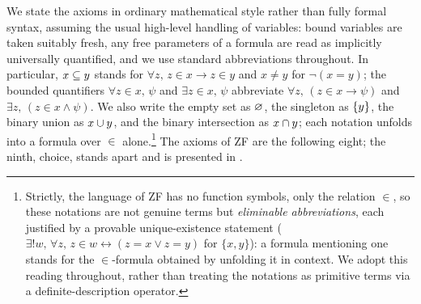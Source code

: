 We state the axioms in ordinary mathematical style rather than fully formal
syntax, assuming the usual high-level handling of variables: bound variables are
taken suitably fresh, any free parameters of a formula are read as implicitly
universally quantified, and we use standard abbreviations throughout.
In particular, $x \subseteq y$ stands for $\forall z,\, z \in x \to z \in y$
and $x \neq y$ for $\lnot(x = y)$; the bounded quantifiers $\forall z \in x,\,\psi$
and $\exists z \in x,\,\psi$ abbreviate $\forall z,\,(z \in x \to \psi)$ and
$\exists z,\,(z \in x \land \psi)$. We also write the empty set as
$\varnothing$, the singleton as $\{y\}$, the binary
union as $x \cup y$, and the binary intersection as
$x \cap y$; each notation unfolds into a formula over $\in$
alone.\footnote{%
  Strictly, the language of ZF has no function symbols, only the relation
  $\in$, so these notations are not genuine terms but \emph{eliminable
  abbreviations}, each justified by a provable unique-existence statement
  (\eg $\exists! w,\,\forall z,\,z \in w \leftrightarrow (z = x \lor z = y)$ for
  $\{x, y\}$): a formula mentioning one stands for the $\in$-formula obtained by
  unfolding it in context. We adopt this reading throughout, rather than treating
  the notations as primitive terms via a definite-description operator.}
The axioms of ZF are the following eight; the ninth, choice, stands apart
and is presented in .

